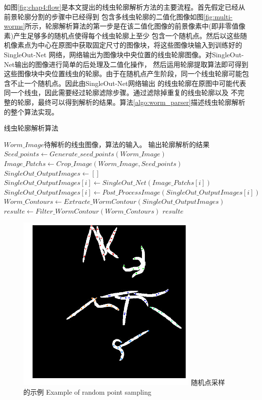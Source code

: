 	如图\ref{fig:chap4:flow}是本文提出的线虫轮廓解析方法的主要流程。首先假定已经从前景轮廓分割的步骤中已经得到
	包含多线虫轮廓的二值化图像如图\ref{fig:multi-worms}所示，轮廓解析算法的第一步是在该二值化图像的前景像素中(即非零值像素)产生足够多的随机点使得每个线虫轮廓上至少
	包含一个随机点。然后以这些随机像素点为中心在原图中获取固定尺寸的图像块，将这些图像块输入到训练好的SingleOut-Net
	网络，网络输出为图像块中央位置的线虫轮廓图像。对SingleOut-Net输出的图像进行简单的后处理及二值化操作，
	然后运用轮廓提取算法即可得到这些图像块中央位置线虫的轮廓。由于在随机点产生阶段，同一个线虫轮廓可能包含不止一个随机点。因此由SingleOut-Net网络输出
	的线虫轮廓在原图中可能代表同一个线虫，因此需要经过轮廓滤除步骤。通过滤除掉重复的线虫轮廓以及
	不完整的轮廓，最终可以得到解析的结果。算法\ref{algo:worm_parser}描述线虫轮廓解析的整个算法实现。
	\begin{algorithm}
	\caption{线虫轮廓解析算法}
	\label{algo:worm_parser}
	\begin{algorithmic}[1]
	\Require $Worm\_Image$待解析的线虫图像，算法的输入。
	\Ensure 输出轮廓解析的结果
			\State $Seed\_points \gets Generate\_seed\_points(Worm\_Image)$
			\State $Image\_Patchs \gets Crop\_Image(Worm\_Image,Seed\_points)$
			\State $SingleOut\_OutputImages \gets []$
				\State $SingleOut\_OutputImages[i] \gets SingleOut\_Net(Image\_Patchs[i])$
				\State $SingleOut\_OutputImages[i] \gets Post\_ProcessImage(SingleOut\_OutputImages[i])$
			\EndFor
			\State $Worm\_Contours \gets Extracte\_WormContour(SingleOut\_OutputImages)$
			\State $resulte \gets Filter\_WormContour(Worm\_Contours)$
			\State \Return $resulte$
	\EndFunction
	\end{algorithmic}
	\end{algorithm}
	\begin{figure}[htp]
	  \centering
	  \includegraphics[width=9cm]{figure/chap4/rand_seed.png}
	  \bicaption
		{随机点采样的示例}
		{Example of random point sampling}
	  \label{fig:chap4:rand_seed}
	\end{figure}
